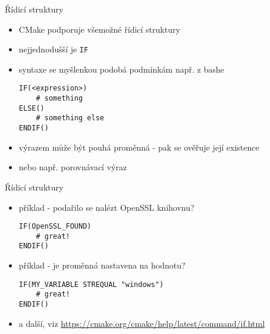 \documentclass{beamer}
\begin{document}
\begin{xframe}{Řídicí struktury}
	\begin{itemize}
		\item CMake podporuje všemožné řídicí struktury
		\item nejjednodušší je \texttt{IF}
		\item syntaxe se myšlenkou podobá podmínkám např. z bashe
\begin{lstlisting}[basicstyle=\fontsize{8}{9}\selectfont\ttfamily]
IF(<expression>)
    # something
ELSE()
    # something else
ENDIF()
\end{lstlisting}
		\item výrazem může být pouhá proměnná - pak se ověřuje její existence
		\item nebo např. porovnávací výraz
	\end{itemize}
\end{xframe}

\begin{xframe}{Řídicí struktury}
	\begin{itemize}
		\item příklad - podařilo se nalézt OpenSSL knihovnu?
\begin{lstlisting}[basicstyle=\fontsize{8}{9}\selectfont\ttfamily]
IF(OpenSSL_FOUND)
    # great!
ENDIF()
\end{lstlisting}
		\item příklad - je proměnná nastavena na hodnotu?
\begin{lstlisting}[basicstyle=\fontsize{8}{9}\selectfont\ttfamily]
IF(MY_VARIABLE STREQUAL "windows")
    # great!
ENDIF()
\end{lstlisting}
		\item a další, viz \url{https://cmake.org/cmake/help/latest/command/if.html}
	\end{itemize}
\end{xframe}
\end{document}
